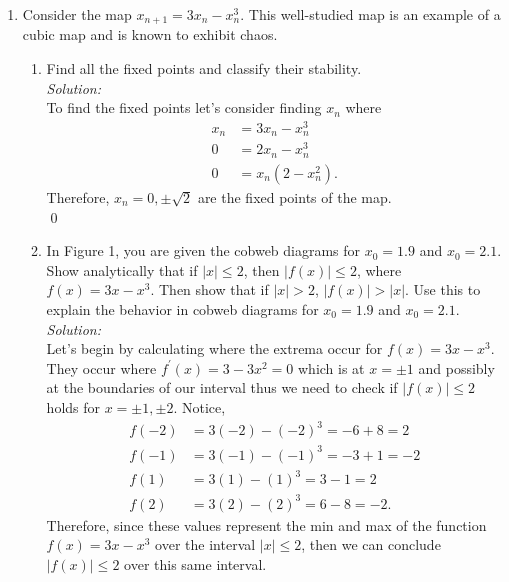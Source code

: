 \documentclass[10pt]{amsart}
\theoremstyle{nonumberplain}
\begin{document}
\begin{enumerate}[label={\bf {\arabic*}:}]
\begin{enumerate}
\end{enumerate}

\item Consider the map $x_{n + 1} = 3x_n - x_n^3$.
This well-studied map is an example of a cubic map and is known to exhibit chaos. \\
\begin{enumerate}

\item Find all the fixed points and classify their stability. \\

\textit{Solution:} \\
To find the fixed points let's consider finding $x_n$ where
\begin{align*}
x_n &= 3x_n - x_n^3 \\
0 &= 2x_n - x_n^3 \\
0 &= x_n (2 - x_n^2).
\end{align*}
Therefore, $x_n = 0, \pm \sqrt{2}$ are the fixed points of the map. \\
\qed \\

\item In Figure 1, you are given the cobweb diagrams for $x_0 = 1.9$ and $x_0 = 2.1$.
Show analytically that if $|x| \leq 2$, then $|f(x)| \leq 2$, where $f(x) = 3x - x^3$.
Then show that if $|x| > 2$, $|f(x)| > |x|$.
Use this to explain the behavior in cobweb diagrams for $x_0 = 1.9$ and $x_0 = 2.1$.  \\

\textit{Solution:} \\
Let's begin by calculating where the extrema occur for $f(x) = 3x - x^3$.
They occur where $f^\prime(x) = 3 -3x^2 = 0$ which is at $x = \pm 1$ and possibly at the boundaries of our interval thus we need to check if $|f(x)| \leq 2$ holds for $x = \pm 1, \pm 2$.
Notice,
\begin{align*}
f(-2) &= 3(-2) - (-2)^3 = -6 + 8 = 2 \\
f(-1) &= 3(-1) - (-1)^3 = -3 + 1 = - 2 \\
f(1) &= 3(1) - (1)^3 = 3 - 1 = 2 \\
f(2) &= 3(2) - (2)^3 = 6 - 8 = -2.
\end{align*}
Therefore, since these values represent the min and max of the function $f(x) = 3x - x^3$ over the interval $|x| \leq 2$, then we can conclude $|f(x)| \leq 2$ over this same interval. \\


\end{enumerate}
\end{enumerate}
\end{document}
